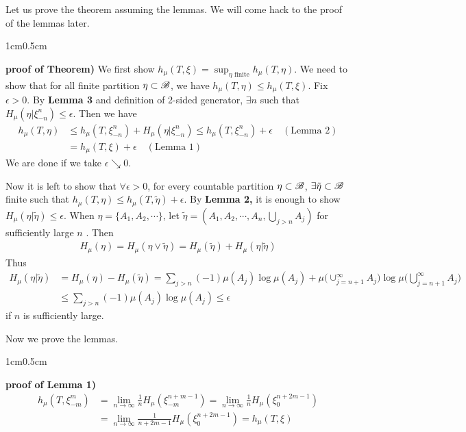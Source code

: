 \documentclass[12pt,a4paper]{report}
\newenvironment{proof}
{\begin{changemargin}{1cm}{0.5cm} 
	}%
	{\end{changemargin}
}
\begin{document}
Let us prove the theorem assuming the lemmas. We will come hack to the proof of the lemmas later.
\s

\begin{proof}
\textbf{proof of Theorem)} We first show $h_{\mu} (T,\xi) = \sup_{\eta \text{ finite}} h_{\mu} (T,\eta)$. We need to show that for all finite partition $\eta \subset \mathscr{B}$, we have $h_{\mu}(T,\eta) \leq h_{\mu}(T,\xi)$. Fix $\epsilon>0$. By \textbf{Lemma 3} and definition of 2-sided generator, $\exists n$ such that $H_{\mu}(\eta | \xi^n_{-n}) \leq \epsilon$. Then we have
\begin{align*}
h_{\mu}(T,\eta) & \leq h_{\mu}(T,\xi_{-n}^n) + H_{\mu}(\eta | \xi^n_{-n}) \leq h_{\mu}(T,\xi_{-n}^n) + \epsilon \quad (\text{Lemma 2}) \\
& = h_{\mu} (T,\xi) + \epsilon \quad (\text{Lemma 1})
\end{align*}
We are done if we take $\epsilon \searrow 0$.
\s

Now it is left to show that $\forall \epsilon >0$, for every countable partition $\eta \subset \mathscr{B}$, $\exists \tilde{\eta} \subset \mathscr{B}$ finite such that $h_{\mu}(T,\eta) \leq h_{\mu}(T, \tilde{\eta}) + \epsilon$. By \textbf{Lemma 2,} it is enough to show $H_{\mu}(\eta |\tilde{\eta}) \leq \epsilon$. When $\eta = \{A_1, A_2, \cdots \}$, let $\tilde{\eta} = (A_1, A_2, \cdots, A_n, \bigcup_{j>n} A_j)$ for sufficiently large $n$ . Then
\begin{align*}
H_{\mu}(\eta) = H_{\mu} (\eta \vee \tilde{\eta}) = H_{\mu}(\tilde{\eta}) + H_{\mu}(\eta |\tilde{\eta})
\end{align*}
Thus
\begin{align*}
H_{\mu}(\eta | \tilde{\eta}) &= H_{\mu}(\eta) - H_{\mu}(\tilde{\eta}) = \sum_{j>n} (-1) \mu(A_j) \log \mu(A_j) + \mu \Big( \cup_{j=n+1}^{\infty} A_j \Big) \log \mu \Big( \bigcup_{j=n+1}^{\infty} A_j \Big) \\
& \leq \sum_{j>n} (-1) \mu(A_j) \log \mu(A_j) \leq \epsilon
\end{align*}
if $n$ is sufficiently large.

\eop
\end{proof}
\s

Now we prove the lemmas.
\s

\begin{proof}
\textbf{proof of Lemma 1)} \begin{align*}
h_{\mu}(T, \xi_{-m}^m) &= \lim_{n\rightarrow \infty} \frac{1}{n} H_{\mu}(\xi^{n+m-1}_{-m}) = \lim_{n\rightarrow \infty} \frac{1}{n} H_{\mu} (\xi_0^{n+2m -1}) \\
&= \lim_{n\rightarrow \infty} \frac{1}{n+2m-1} H_{\mu}(\xi_0^{n+2m-1}) = h_{\mu}(T,\xi)
\end{align*}

\eop
\end{proof}
\s
\end{document}

